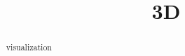 \documentclass{ximera}
\title{3D}
\begin{document}
\begin{abstract}
visualization
\end{abstract}
\maketitle
\end{document}
